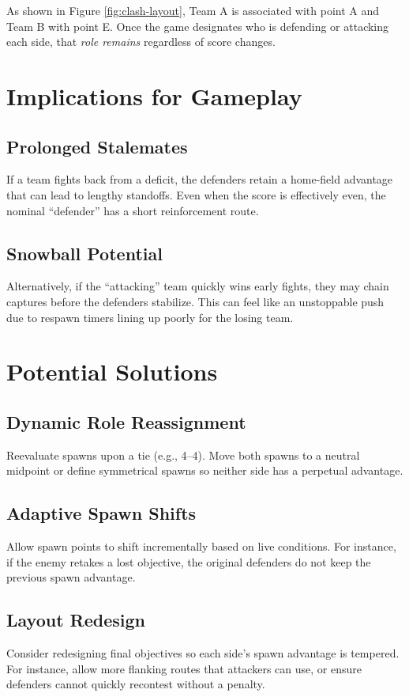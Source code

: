 \documentclass[12pt]{article}
\begin{document}
As shown in Figure \ref{fig:clash-layout}, Team A is associated with point A 
and Team B with point E. Once the game designates who is defending or attacking 
each side, that \emph{role remains} regardless of score changes.

\section{Implications for Gameplay}
\subsection{Prolonged Stalemates}
If a team fights back from a deficit, the defenders retain a home-field advantage 
that can lead to lengthy standoffs. Even when the score is effectively even, 
the nominal ``defender'' has a short reinforcement route.

\subsection{Snowball Potential}
Alternatively, if the ``attacking'' team quickly wins early fights, they may chain 
captures before the defenders stabilize. This can feel like an unstoppable push 
due to respawn timers lining up poorly for the losing team.

\section{Potential Solutions}

\subsection{Dynamic Role Reassignment}
Reevaluate spawns upon a tie (e.g., 4--4). Move both spawns to a neutral midpoint 
or define symmetrical spawns so neither side has a perpetual advantage.

\subsection{Adaptive Spawn Shifts}
Allow spawn points to shift incrementally based on live conditions. For instance, 
if the enemy retakes a lost objective, the original defenders do not keep the 
previous spawn advantage.

\subsection{Layout Redesign}
Consider redesigning final objectives so each side’s spawn advantage is tempered. 
For instance, allow more flanking routes that attackers can use, or ensure defenders 
cannot quickly recontest without a penalty.
\end{document}
